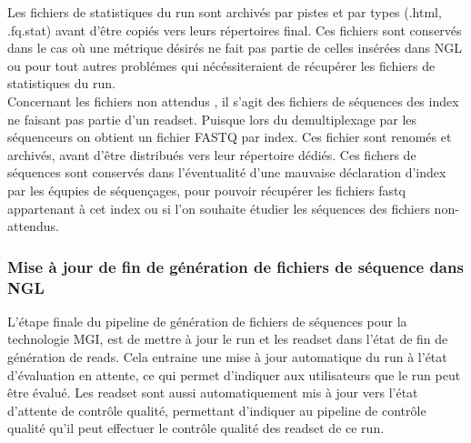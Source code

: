 Les fichiers de statistiques du run sont archivés par pistes et par types (.html, .fq.stat) avant d'être copiés vers leurs répertoires final.
Ces fichiers sont conservés dans le cas où une métrique désirés ne fait pas partie de celles insérées dans NGL ou pour tout autres problémes qui nécéssiteraient de récupérer les fichiers de statistiques du run.\\

Concernant les fichiers \og non attendus \fg{}, il s'agit des fichiers de séquences des index ne faisant pas partie d'un readset. Puisque lors du demultiplexage par les séquenceurs on obtient un fichier FASTQ par index.
Ces fichier sont renomés et archivés, avant d'être distribués vers leur répertoire dédiés.
Ces fichers de séquences sont conservés dans l'éventualité d'une mauvaise déclaration d'index par les équpies de séquençages, pour pouvoir récupérer les fichiers fastq appartenant à cet index ou si l'on souhaite étudier les séquences des fichiers \og non-attendus\fg{}.\\

\subsubsection*{Mise à jour de fin de génération de fichiers de séquence dans NGL}
L'étape finale du pipeline de génération de fichiers de séquences pour la technologie MGI, est de mettre à jour le run et les readset dans l'état de \og fin de génération de reads\fg{}.
Cela entraine une mise à jour automatique du run à l'état \og d'évaluation en attente\fg{}, ce qui permet d'indiquer aux utilisateurs que le run peut être évalué.
Les readset sont aussi automatiquement mis à jour vers l'état \og d'attente de contrôle qualité\fg{}, permettant d'indiquer au pipeline de contrôle qualité qu'il peut effectuer le contrôle qualité des readset de ce run.

